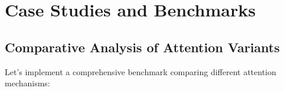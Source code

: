 
\section{Case Studies and Benchmarks}

\subsection{Comparative Analysis of Attention Variants}

Let's implement a comprehensive benchmark comparing different attention mechanisms:

